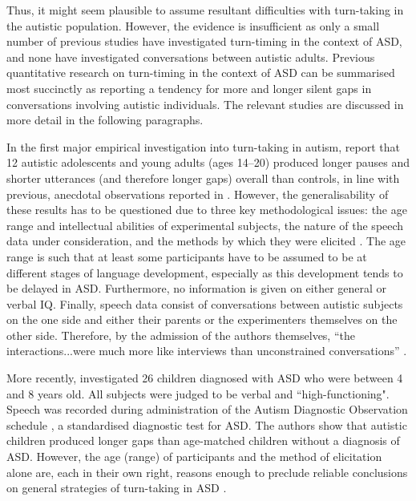 Thus, it might seem plausible to assume resultant difficulties with turn-taking in the autistic population. However, the evidence is insufficient as only a small number of previous studies have investigated turn-timing in the context of ASD, and none have investigated conversations between autistic adults. Previous quantitative research on turn-timing in the context of ASD  can be summarised most succinctly as reporting a tendency for more and longer silent gaps in conversations involving autistic individuals. The relevant studies are discussed in more detail in the following paragraphs.

In the first major empirical investigation into turn-taking in autism, \citet{feldsteinChronographyInteractionsAutistic1982} report that 12 autistic adolescents and young adults (ages 14--20) produced longer pauses and shorter utterances (and therefore longer gaps) overall than controls, in line with previous, anecdotal observations reported in \citet{fayEmergingLanguageAutistic1980}. However, the generalisability of these results has to be questioned due to three key methodological issues: the age range and intellectual abilities of experimental subjects, the nature of the speech data under consideration, and the methods by which they were elicited \citep[cf.][]{griceLinguisticProsodyAutism2023}. The age range is such that at least some participants have to be assumed to be at different stages of language development, especially as this development tends to be delayed in ASD. Furthermore, no information is given on either general or verbal IQ. Finally, speech data consist of conversations between autistic subjects on the one side and either their parents or the experimenters themselves on the other side. Therefore, by the admission of the authors themselves, “the interactions...were much more like interviews than unconstrained conversations” \citep[p. 453]{feldsteinChronographyInteractionsAutistic1982}.

More recently, \citet{heemanAutismInteractionalAspects2010} investigated 26 children diagnosed with ASD who were between 4 and 8 years old. All subjects were judged to be verbal and ``high-functioning". Speech was recorded during administration of the Autism Diagnostic Observation schedule \citep[ADOS, ][]{lordAutismDiagnosticObservation2000}, a standardised diagnostic test for ASD. The authors show that autistic children produced longer gaps than age-matched children without a diagnosis of ASD. However, the age (range) of participants and the method of elicitation alone are, each in their own right, reasons enough to preclude reliable conclusions on general strategies of turn-taking in ASD \citep[for similar results on Korean see][]{choiConversationalTurnTakingTopic2013}.

